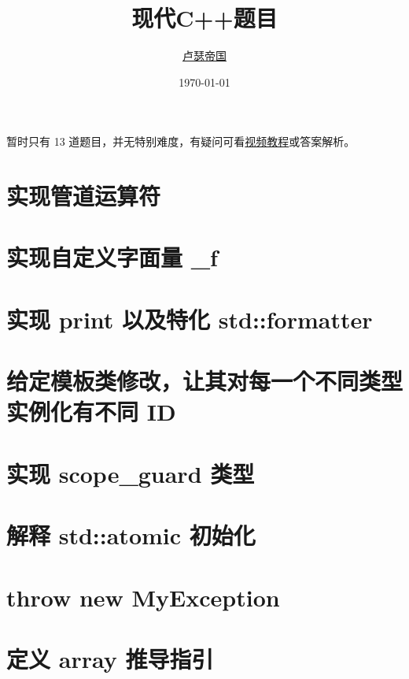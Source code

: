 \documentclass[11pt,fancyhdr]{ctexart}
\title{现代C++题目}
\author{\href{https://github.com/Mq-b/Loser-HomeWork}{卢瑟帝国}\\}
\date{\today}
\begin{document}
\maketitle

暂时只有 13 道题目，并无特别难度，有疑问可看\href{https://www.bilibili.com/video/BV1Zj411r7eP/}{视频教程}或答案解析。


\section{实现管道运算符}


\section{实现自定义字面量 \_f}

\section{实现 print 以及特化 std::formatter}



\section{给定模板类修改，让其对每一个不同类型实例化有不同 ID}


\section{实现 scope\_guard 类型}


\section{解释 std::atomic 初始化}


\section{throw new MyException}


\section{定义 array 推导指引}

\end{document}
